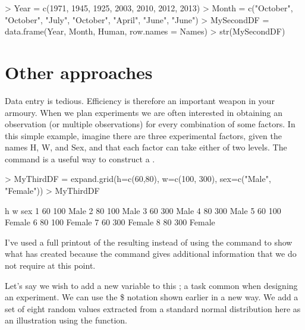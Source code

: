 \begin{Schunk}
\begin{Sinput}
> Year = c(1971, 1945, 1925, 2003, 2010, 2012, 2013) 
> Month = c("October", "October", "July", "October", "April", "June", "June") 
> MySecondDF = data.frame(Year, Month, Human, row.names = Names) 
> str(MySecondDF) 
\end{Sinput}
\end{Schunk}

 
\section{Other approaches} 
 
Data entry is tedious. Efficiency is therefore an important weapon in your armoury. When we plan experiments we are often interested in obtaining an observation (or multiple observations) for every combination of some factors. In this simple example, imagine there are three experimental factors, given the names H, W, and Sex, and that each factor can take either of two levels. The  command is a useful way to construct a . 

\begin{Schunk}
\begin{Sinput}
> MyThirdDF = expand.grid(h=c(60,80), w=c(100, 300), sex=c("Male", "Female")) 
> MyThirdDF 
\end{Sinput}
\begin{Soutput}
   h   w    sex
1 60 100   Male
2 80 100   Male
3 60 300   Male
4 80 300   Male
5 60 100 Female
6 80 100 Female
7 60 300 Female
8 80 300 Female
\end{Soutput}
\end{Schunk}

 
I've used a full printout of the resulting  instead of using the  command to show what \R{} has created because the  command gives additional information that we do not require at this point. 
 
Let's say we wish to add a new variable to this ; a task common when designing an experiment. We can use the \$ notation shown earlier in a new way. We add a set of eight random values extracted from a standard normal distribution here as an illustration using the  function. 

